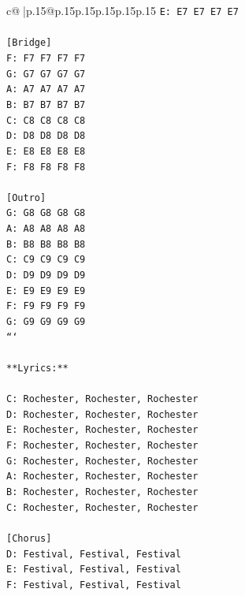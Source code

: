 \documentclass{article}
\begin{document}
{\begin{supertabular}{c@{$\;$}|p{.15\linewidth}@{}p{.15\linewidth}p{.15\linewidth}p{.15\linewidth}p{.15\linewidth}p{.15\linewidth}}
{{{\texttt{E: E7 E7 E7 E7} \\
\\ 
\texttt{{[}Bridge{]}} \\
\texttt{F: F7 F7 F7 F7} \\
\texttt{G: G7 G7 G7 G7} \\
\texttt{A: A7 A7 A7 A7} \\
\texttt{B: B7 B7 B7 B7} \\
\texttt{C: C8 C8 C8 C8} \\
\texttt{D: D8 D8 D8 D8} \\
\texttt{E: E8 E8 E8 E8} \\
\texttt{F: F8 F8 F8 F8} \\
\\ 
\texttt{{[}Outro{]}} \\
\texttt{G: G8 G8 G8 G8} \\
\texttt{A: A8 A8 A8 A8} \\
\texttt{B: B8 B8 B8 B8} \\
\texttt{C: C9 C9 C9 C9} \\
\texttt{D: D9 D9 D9 D9} \\
\texttt{E: E9 E9 E9 E9} \\
\texttt{F: F9 F9 F9 F9} \\
\texttt{G: G9 G9 G9 G9} \\
\texttt{```} \\
\\ 
\texttt{**Lyrics:**} \\
\\ 
\texttt{C: Rochester, Rochester, Rochester} \\
\texttt{D: Rochester, Rochester, Rochester} \\
\texttt{E: Rochester, Rochester, Rochester} \\
\texttt{F: Rochester, Rochester, Rochester} \\
\texttt{G: Rochester, Rochester, Rochester} \\
\texttt{A: Rochester, Rochester, Rochester} \\
\texttt{B: Rochester, Rochester, Rochester} \\
\texttt{C: Rochester, Rochester, Rochester} \\
\\ 
\texttt{{[}Chorus{]}} \\
\texttt{D: Festival, Festival, Festival} \\
\texttt{E: Festival, Festival, Festival} \\
\texttt{F: Festival, Festival, Festival} \\
}}}
\end{supertabular}}
\end{document}
